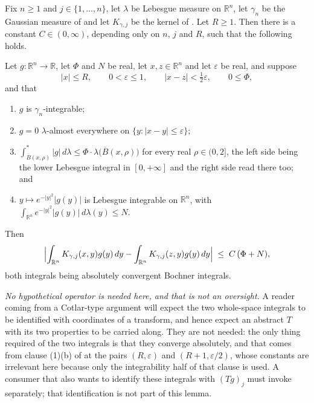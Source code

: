 \begin{lemma}
Fix $n \geq 1$ and $j \in \{1,\ldots,n\}$, let $\lambda$ be Lebesgue measure on
$\mathbb{R}^n$, let $\gamma_n$ be the Gaussian measure of
 and let $K_{\gamma,j}$ be the kernel of
.  Let $R \geq 1$.  Then there is a constant
$C \in (0,\infty)$, depending only on $n$, $j$ and $R$, such that the following
holds.

Let $g : \mathbb{R}^n \to \mathbb{R}$, let $\Phi$ and $N$ be real, let
$x,z \in \mathbb{R}^n$ and let $\varepsilon$ be real, and suppose
\[
  |x| \leq R, \qquad 0 < \varepsilon \leq 1, \qquad |x-z| < \tfrac12\varepsilon ,
  \qquad 0 \leq \Phi ,
\]
and that
\begin{enumerate}
\item[(a)] $g$ is $\gamma_n$-integrable;
\item[(b)] $g = 0$ $\lambda$-almost everywhere on $\{y : |x-y| \leq \varepsilon\}$;
\item[(c)] $\displaystyle\int_{\overline B(x,\rho)}^{*}|g|\,d\lambda
  \leq \Phi\cdot\lambda\bigl(\overline B(x,\rho)\bigr)$ for every real
  $\rho \in (0,2]$, the left side being the lower Lebesgue integral in
  $[0,+\infty]$ and the right side read there too; and
\item[(d)] $y \mapsto e^{-|y|^2}|g(y)|$ is Lebesgue integrable on
  $\mathbb{R}^n$, with
  $\displaystyle\int_{\mathbb{R}^n}e^{-|y|^2}|g(y)|\,d\lambda(y) \leq N$.
\end{enumerate}
Then
\[
  \Bigl|\int_{\mathbb{R}^n}K_{\gamma,j}(x,y)g(y)\,dy
      - \int_{\mathbb{R}^n}K_{\gamma,j}(z,y)g(y)\,dy\Bigr|
    \;\leq\; C\,(\Phi + N) ,
\]
both integrals being absolutely convergent Bochner integrals.

\emph{No hypothetical operator is needed here, and that is not an oversight.}
A reader coming from a Cotlar-type argument will expect the two whole-space
integrals to be identified with coordinates of a transform, and hence expect an
abstract $T$ with its two properties to be carried along.  They are not needed:
the only thing required of the two integrals is that they converge absolutely,
and that comes from clause (1)(b) of  at
the pairs $(R,\varepsilon)$ and $(R+1,\varepsilon/2)$, whose constants are
irrelevant here because only the integrability half of that clause is used.  A
consumer that also wants to identify these integrals with $(Tg)_j$ must invoke
 separately; that identification is not part of
this lemma.


\end{lemma}
